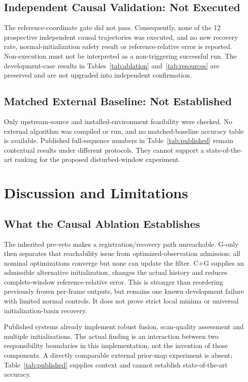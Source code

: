 \documentclass[journal,10pt,letterpaper]{IEEEtran}
\begin{document}
\subsection{Independent Causal Validation: Not Executed}
The reference-coordinate gate did not pass. Consequently, none of the 12 prospective independent causal trajectories was executed, and no new recovery rate, normal-initialization safety result or reference-relative error is reported. Non-execution must not be interpreted as a non-triggering successful run. The development-case results in Tables~\ref{tab:ablation} and~\ref{tab:resources} are preserved and are not upgraded into independent confirmation.

\subsection{Matched External Baseline: Not Established}
Only upstream-source and installed-environment feasibility were checked. No external algorithm was compiled or run, and no matched-baseline accuracy table is available. Published full-sequence numbers in Table~\ref{tab:published} remain contextual results under different protocols. They cannot support a state-of-the-art ranking for the proposed disturbed-window experiment.

\section{Discussion and Limitations}
\subsection{What the Causal Ablation Establishes}
The inherited pre-veto makes a registration/recovery path unreachable. G-only then separates that reachability issue from optimized-observation admission: all nominal optimizations converge but none can update the filter. C+G supplies an admissible alternative initialization, changes the actual history and reduces complete-window reference-relative error. This is stronger than reordering previously frozen per-frame outputs, but remains one known development failure with limited normal controls. It does not prove strict local minima or universal initialization-basin recovery.

Published systems already implement robust fusion, scan-quality assessment and multiple initializations. The actual finding is an interaction between two responsibility boundaries in this implementation, not the invention of those components. A directly comparable external prior-map experiment is absent; Table~\ref{tab:published} supplies context and cannot establish state-of-the-art accuracy.
\end{document}
